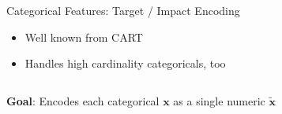 \begin{frame}{Categorical Features: Target / Impact Encoding}
  \begin{itemize}
    \item Well known from CART
    \item Handles high cardinality categoricals, too
  \end{itemize}

  \begin{columns}
    \begin{column}{0.7\textwidth}


      \textbf{Goal}: Encodes each categorical $\bm{x}$ as a single numeric $\tilde{\bm{x}}$
      

\end{column}
\end{columns}
\end{frame}
